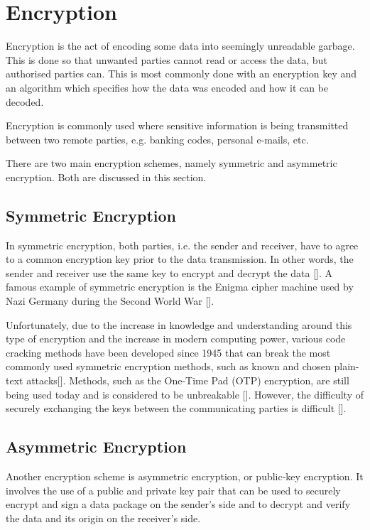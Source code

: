 \section{Encryption}

Encryption is the act of encoding some data into seemingly unreadable garbage. This is done so
that unwanted parties cannot read or access the data, but authorised parties can. This
is most commonly done with an encryption key and an algorithm which specifies how the data
was encoded and how it can be decoded.

Encryption is commonly used where sensitive information is being transmitted between
two remote parties, e.g. banking codes, personal e-mails, etc.

There are two main encryption schemes, namely symmetric and asymmetric encryption. Both
are discussed in this section.

\subsection{Symmetric Encryption}

In symmetric encryption, both parties, i.e. the sender and receiver, have to agree to a common
encryption key prior to the data transmission. In other words, the sender and receiver use the
same key to encrypt and decrypt the data [\cite{article:symm-encryption}]. A famous example
of symmetric encryption is the Enigma cipher machine used by Nazi Germany
during the Second World War [\cite{article:enigma}].

Unfortunately, due to the increase in knowledge and understanding around this type of
encryption and the increase in modern computing power, various code cracking methods have been
developed since 1945 that can break the most commonly used symmetric encryption
methods, such as known and chosen plain-text attacks[\cite{journal:cypher-attacks}].
Methods, such as the One-Time Pad (OTP) encryption, are still being
used today and is considered to be unbreakable [\cite{article:otp}]. However,
the difficulty of securely exchanging the keys between the communicating parties
is difficult [\cite{article:otp}]. 

\subsection{Asymmetric Encryption}
\label{sec:assymetric-encryption}

Another encryption scheme is asymmetric encryption, or public-key
encryption. It involves the use of a public and private key pair that can be
used to securely encrypt and sign a data package on the sender's side and to
decrypt and verify the data and its origin on the receiver's side.

